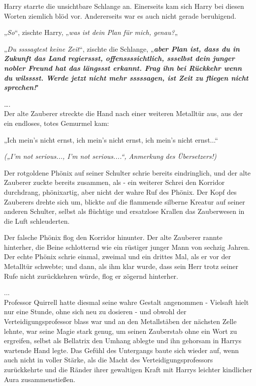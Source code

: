 {Harry starrte die unsichtbare Schlange an. Einerseits kam sich Harry bei diesen Worten ziemlich blöd vor. Andererseits war es auch nicht gerade beruhigend.

„\emph{So}“, zischte Harry, „\emph{was ist dein Plan für mich, genau?}„

„\emph{Du ssssagtest keine Zeit}“, zischte die Schlange, „\textbf{\emph{aber Plan ist, dass du in Zukunft das Land regierssst, offenssssichtlich, ssselbst dein junger nobler Freund hat das längssst erkannt. Frag ihn bei Rückkehr wenn du wilsssst. Werde jetzt nicht mehr sssssagen, ist Zeit zu fliegen nicht sprechen!}}"

….\\ Der alte Zauberer streckte die Hand nach einer weiteren Metalltür aus, aus der ein endloses, totes Gemurmel kam:

„Ich mein's nicht ernst, ich mein's nicht ernst, ich mein's nicht ernst...“

\hfill\break

\emph{(„I'm not serious..., I'm not serious....“, Anmerkung des Übersetzers!)}

Der rotgoldene Phönix auf seiner Schulter schrie bereits eindringlich, und der alte Zauberer zuckte bereits zusammen, als - ein weiterer Schrei den Korridor durchdrang, phönixartig, aber nicht der wahre Ruf des Phönix. Der Kopf des Zauberers drehte sich um, blickte auf die flammende silberne Kreatur auf seiner anderen Schulter, selbst als flüchtige und ersatzlose Krallen das Zauberwesen in die Luft schleuderten.

Der falsche Phönix flog den Korridor hinunter. Der alte Zauberer rannte hinterher, die Beine schlotternd wie ein rüstiger junger Mann von sechzig Jahren. Der echte Phönix schrie einmal, zweimal und ein drittes Mal, als er vor der Metalltür schwebte; und dann, als ihm klar wurde, dass sein Herr trotz seiner Rufe nicht zurückkehren würde, flog er zögernd hinterher.

...\\ Professor Quirrell hatte diesmal seine wahre Gestalt angenommen - Vielsaft hielt nur eine Stunde, ohne sich neu zu dosieren - und obwohl der Verteidigungsprofessor blass war und an den Metallstäben der nächsten Zelle lehnte, war seine Magie stark genug, um seinen Zauberstab ohne ein Wort zu ergreifen, selbst als Bellatrix den Umhang ablegte und ihn gehorsam in Harrys wartende Hand legte. Das Gefühl des Untergangs baute sich wieder auf, wenn auch nicht in voller Stärke, als die Macht des Verteidigungsprofessors zurückkehrte und die Ränder ihrer gewaltigen Kraft mit Harrys leichter kindlicher Aura zusammenstießen.

}
